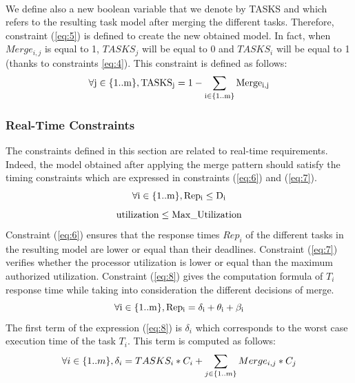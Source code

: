 \documentclass[runningheads,a4paper]{llncs}
\begin{document}
\\We define also a new boolean variable that we denote by TASKS and which refers to the resulting task model after merging the different tasks. Therefore, constraint (\ref{eq:5}) is defined to create the new obtained model. In fact, when $Merge_{i,j}$ is equal to 1, $TASKS_{j}$ will be equal to 0 and $TASKS_{i}$ will be equal to 1 (thanks to constraints \ref{eq:4}). This constraint is defined as follows:   
\begin{equation}
\footnotesize{\mathrm{\forall{j \in \{1..m\}}, TASKS_{j} = 1 - \sum_{i \in \{1..m\}}Merge_{i,j} }}
\label{eq:5}
\end{equation}
\subsubsection{Real-Time Constraints}
The constraints defined in this section are related to real-time requirements. Indeed, the model obtained after applying the merge pattern should satisfy the timing constraints which are expressed in constraints (\ref{eq:6}) and (\ref{eq:7}). 
\begin{equation}
\footnotesize{\mathrm{\forall{i \in \{1..m\}}, Rep_{i} \leq D_{i} } }
\label{eq:6}
\end{equation}
\begin{equation}
\footnotesize{\mathrm{utilization \leq Max\_Utilization}  }
\label{eq:7}
\end{equation}
Constraint (\ref{eq:6}) ensures that the response times $Rep_i$ of the different tasks in the resulting model are lower or equal than their deadlines. Constraint (\ref{eq:7}) verifies whether the processor utilization is lower or equal than the maximum authorized utilization. %
Constraint (\ref{eq:8}) gives the computation formula of $T_i$ response time while taking into consideration the different decisions of merge. 
\begin{equation}
\footnotesize{\mathrm{\forall{i \in \{1..m\}}, Rep_{i} = \delta_i + \theta_i + \beta_i }}
\label{eq:8}
\end{equation}
The first term of the expression (\ref{eq:8}) is $\delta_i$ which corresponds to the worst case execution time of the task $T_i$. This term is computed as follows: 
\begin{equation}
\footnotesize{\forall{i \in \{1..m\}}, \delta_i = TASKS_i *C_i + \sum_{j \in \{1..m\}} Merge_{i,j}*C_j }
\label{eq:9}
\end{equation}
\end{document}
